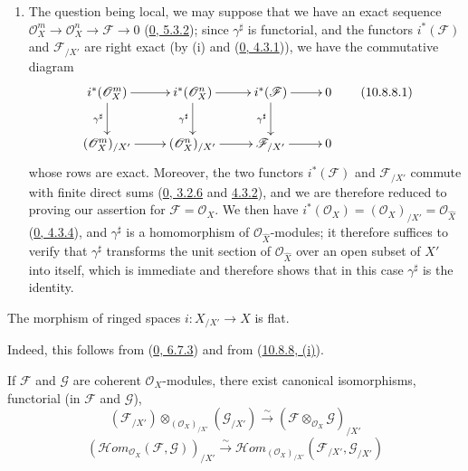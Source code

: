 \begin{enumerate}
  \item[\rm{(ii)}] The question being local, we may suppose that we have
    an exact sequence
    $\mathscr{O}_X^m\to\mathscr{O}_X^n\to\mathscr{F}\to0$
    (\hyperref[0.5.3.2]{0, 5.3.2}); since $\gamma^\sharp$ is
    functorial, and the functors $i^*(\mathscr{F})$ and
    $\mathscr{F}_{/X'}$ are right exact (by (i) and
    (\hyperref[0.4.3.1]{0, 4.3.1})), we have the commutative diagram
    \[
      \xymatrix{
        i^*(\mathscr{O}_X^m)\ar[r]\ar[d]_{\gamma^\sharp} &
        i^*(\mathscr{O}_X^n)\ar[r]\ar[d]_{\gamma^\sharp} &
        i^*(\mathscr{F})\ar[r]\ar[d]_{\gamma^\sharp} &
        0\\
        (\mathscr{O}_X^m)_{/X'}\ar[r] &
        (\mathscr{O}_X^n)_{/X'}\ar[r] &
        \mathscr{F}_{/X'}\ar[r] &
        0
      }
      \tag{10.8.8.1}\label{I.10.8.8.1}
    \]
    whose rows are exact. Moreover, the two functors
    $i^*(\mathscr{F})$ and $\mathscr{F}_{/X'}$ commute with finite direct
    sums (\hyperref[0.3.2.6]{0, 3.2.6} and
    \hyperref[0.4.3.2]{4.3.2}), and we are therefore reduced to proving
    our assertion for $\mathscr{F}=\mathscr{O}_X$. We then have
    $i^*(\mathscr{O}_X)=(\mathscr{O}_X)_{/X'}=
    \mathscr{O}_{\widehat X}$
    (\hyperref[0.4.3.4]{0, 4.3.4}), and $\gamma^\sharp$ is a
    homomorphism of $\mathscr{O}_{\widehat X}$-modules; it therefore
    suffices to verify that $\gamma^\sharp$ transforms the unit section of
    $\mathscr{O}_{\widehat X}$ over an open subset of $X'$ into itself,
    which is immediate and therefore shows that in this case
    $\gamma^\sharp$ is the identity.
\end{enumerate}

\begin{corollary}[10.8.9]
\label{I.10.8.9}
The morphism of ringed spaces $i:X_{/X'}\to X$ is flat.
\end{corollary}

Indeed, this follows from (\hyperref[0.6.7.3]{0, 6.7.3}) and from
(\hyperref[I.10.8.8]{10.8.8, (i)}).

\begin{corollary}[10.8.10]
\label{I.10.8.10}
If $\mathscr{F}$ and $\mathscr{G}$ are coherent
$\mathscr{O}_X$-modules, there exist canonical isomorphisms, functorial
(in $\mathscr{F}$ and $\mathscr{G}$),
\[
  (\mathscr{F}_{/X'})\otimes_{(\mathscr{O}_X)_{/X'}}
  (\mathscr{G}_{/X'})
  \xrightarrow{\sim}
  (\mathscr{F}\otimes_{\mathscr{O}_X}\mathscr{G})_{/X'}
  \tag{10.8.10.1}\label{I.10.8.10.1}
\]
\[
  (\mathscr{H}\!om_{\mathscr{O}_X}(\mathscr{F},\mathscr{G}))_{/X'}
  \xrightarrow{\sim}
  \mathscr{H}\!om_{(\mathscr{O}_X)_{/X'}}
  (\mathscr{F}_{/X'},\mathscr{G}_{/X'})
  \tag{10.8.10.2}\label{I.10.8.10.2}
\]
\end{corollary}

